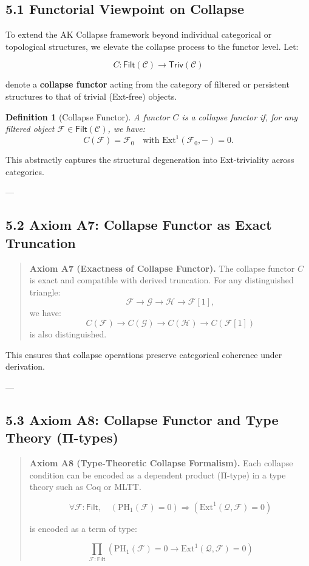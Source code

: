 \documentclass[11pt]{article}
\newtheorem{definition}[theorem]{Definition}
\begin{document}
\subsection*{5.1 Functorial Viewpoint on Collapse}

To extend the AK Collapse framework beyond individual categorical or topological structures,  
we elevate the collapse process to the functor level. Let:

\[
C: \mathsf{Filt}(\mathcal{C}) \longrightarrow \mathsf{Triv}(\mathcal{C})
\]

denote a \textbf{collapse functor} acting from the category of filtered or persistent structures to that of trivial (Ext-free) objects.

\begin{definition}[Collapse Functor]
A functor \( C \) is a collapse functor if, for any filtered object \( \mathcal{F} \in \mathsf{Filt}(\mathcal{C}) \), we have:
\[
C(\mathcal{F}) = \mathcal{F}_0 \quad \text{with } \mathrm{Ext}^1(\mathcal{F}_0, -) = 0.
\]
\end{definition}

This abstractly captures the structural degeneration into Ext-triviality across categories.

---

\subsection*{5.2 Axiom A7: Collapse Functor as Exact Truncation}

\begin{quote}
\textbf{Axiom A7 (Exactness of Collapse Functor).}  
The collapse functor \( C \) is exact and compatible with derived truncation.  
For any distinguished triangle:
\[
\mathcal{F} \to \mathcal{G} \to \mathcal{H} \to \mathcal{F}[1],
\]
we have:
\[
C(\mathcal{F}) \to C(\mathcal{G}) \to C(\mathcal{H}) \to C(\mathcal{F}[1])
\]
is also distinguished.
\end{quote}

This ensures that collapse operations preserve categorical coherence under derivation.

---

\subsection*{5.3 Axiom A8: Collapse Functor and Type Theory (Π-types)}

\begin{quote}
\textbf{Axiom A8 (Type-Theoretic Collapse Formalism).}  
Each collapse condition can be encoded as a dependent product (Π-type) in a type theory such as Coq or MLTT.

\[
\forall \mathcal{F} : \mathsf{Filt},\quad 
\left( \mathrm{PH}_1(\mathcal{F}) = 0 \right) \Rightarrow 
\left( \mathrm{Ext}^1(\mathcal{Q}, \mathcal{F}) = 0 \right)
\]

is encoded as a term of type:

\[
\prod_{\mathcal{F}:\mathsf{Filt}} 
\left( \mathrm{PH}_1(\mathcal{F}) = 0 \rightarrow \mathrm{Ext}^1(\mathcal{Q}, \mathcal{F}) = 0 \right)
\]
\end{quote}
\end{document}
